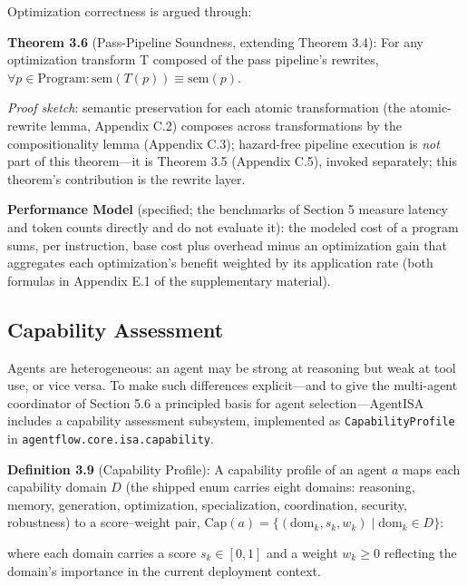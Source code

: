 \documentclass[
  sigconf,
  anonymous]{acmart}
\begin{document}
Optimization correctness is argued through:

\textbf{Theorem 3.6} (Pass-Pipeline Soundness, extending Theorem 3.4):
For any optimization transform T composed of the pass pipeline's
rewrites,
\(\forall p \in \text{Program}: \text{sem}(T(p)) \equiv \text{sem}(p)\).

\emph{Proof sketch}: semantic preservation for each atomic
transformation (the atomic-rewrite lemma, Appendix C.2) composes across
transformations by the compositionality lemma (Appendix C.3);
hazard-free pipeline execution is \emph{not} part of this theorem---it
is Theorem 3.5 (Appendix C.5), invoked separately; this theorem's
contribution is the rewrite layer.

\textbf{Performance Model} (specified; the benchmarks of Section 5
measure latency and token counts directly and do not evaluate it): the
modeled cost of a program sums, per instruction, base cost plus overhead
minus an optimization gain that aggregates each optimization's benefit
weighted by its application rate (both formulas in Appendix E.1 of the
supplementary material).

\subsection{Capability Assessment}\label{capability-assessment}

Agents are heterogeneous: an agent may be strong at reasoning but weak
at tool use, or vice versa. To make such differences explicit---and to
give the multi-agent coordinator of Section 5.6 a principled basis for
agent selection---AgentISA includes a capability assessment subsystem,
implemented as \texttt{CapabilityProfile} in
\texttt{agentflow.core.isa.capability}.

\textbf{Definition 3.9} (Capability Profile): A capability profile of an
agent \(a\) maps each capability domain \(D\) (the shipped enum carries
eight domains: reasoning, memory, generation, optimization,
specialization, coordination, security, robustness) to a score--weight
pair,
\(\text{Cap}(a) = \{(\text{dom}_k, s_k, w_k) \mid \text{dom}_k \in D\}\):

where each domain carries a score \(s_k \in [0, 1]\) and a weight
\(w_k \geq 0\) reflecting the domain's importance in the current
deployment context.
\end{document}
